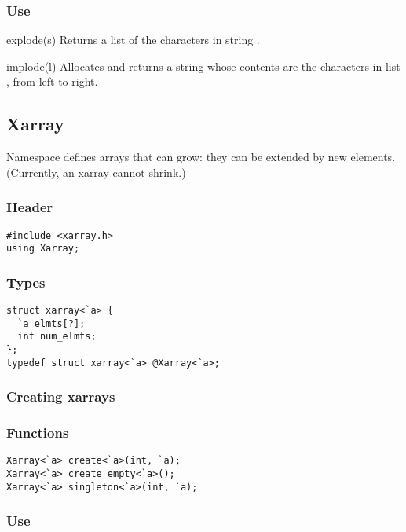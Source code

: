 \subsubsection*{Use}

\begin{defun}{explode}{(s)}
Returns a list of the characters in string .
\end{defun}

\begin{defun}{implode}{(l)}
Allocates and returns a string whose contents are the characters in list
, from left to right.
\end{defun}

\subsection{Xarray}

Namespace  defines arrays that can grow: they can be
extended by new elements.  (Currently, an xarray cannot shrink.)

\subsubsection*{Header}
\begin{verbatim}
#include <xarray.h>
using Xarray;
\end{verbatim}

\subsubsection*{Types}
\begin{verbatim}
struct xarray<`a> {
  `a elmts[?];
  int num_elmts;
};
typedef struct xarray<`a> @Xarray<`a>;
\end{verbatim}

\subsubsection*{Creating xarrays}
\subsubsection*{Functions}
\begin{verbatim}
Xarray<`a> create<`a>(int, `a);
Xarray<`a> create_empty<`a>();
Xarray<`a> singleton<`a>(int, `a);
\end{verbatim}

\subsubsection*{Use}

